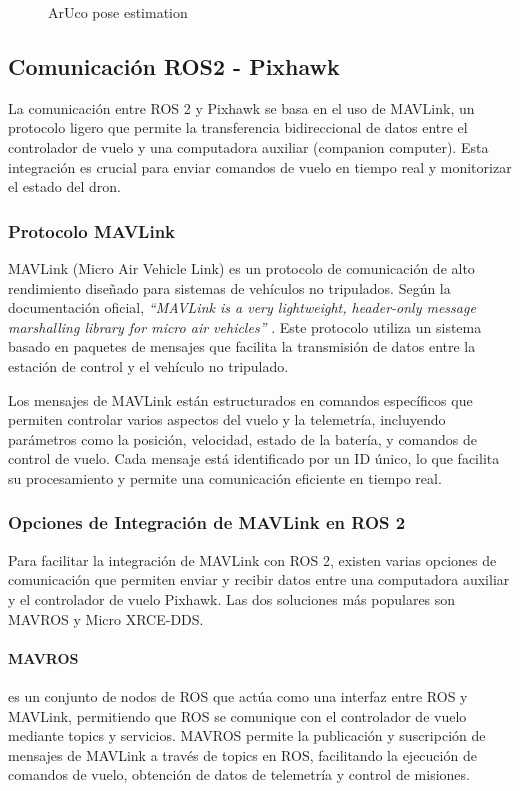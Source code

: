 \begin{figure}[h!]
\begin{minipage}{0.48\textwidth}
                \caption{ArUco pose estimation} 
                \label{fig:aruco_pose_estimation}
            \end{minipage}
    \end{figure}

\subsection{Comunicación ROS2 - Pixhawk}
    La comunicación entre ROS 2 y Pixhawk se basa en el uso de MAVLink, un protocolo ligero que permite la transferencia bidireccional de datos entre el controlador de vuelo y una computadora auxiliar (companion computer). Esta integración es crucial para enviar comandos de vuelo en tiempo real y monitorizar el estado del dron.
    
        \subsubsection{Protocolo MAVLink}
        MAVLink (Micro Air Vehicle Link) es un protocolo de comunicación de alto rendimiento diseñado para sistemas de vehículos no tripulados. Según la documentación oficial, \textit{“MAVLink is a very lightweight, header-only message marshalling library for micro air vehicles”} \cite{mavlink_docs}. Este protocolo utiliza un sistema basado en paquetes de mensajes que facilita la transmisión de datos entre la estación de control y el vehículo no tripulado.
    
        Los mensajes de MAVLink están estructurados en comandos específicos que permiten controlar varios aspectos del vuelo y la telemetría, incluyendo parámetros como la posición, velocidad, estado de la batería, y comandos de control de vuelo. Cada mensaje está identificado por un ID único, lo que facilita su procesamiento y permite una comunicación eficiente en tiempo real.
    
        \subsubsection{Opciones de Integración de MAVLink en ROS 2}
        Para facilitar la integración de MAVLink con ROS 2, existen varias opciones de comunicación que permiten enviar y recibir datos entre una computadora auxiliar y el controlador de vuelo Pixhawk. Las dos soluciones más populares son MAVROS y Micro XRCE-DDS.
    
            \paragraph{MAVROS}
            es un conjunto de nodos de ROS que actúa como una interfaz entre ROS y MAVLink, permitiendo que ROS se comunique con el controlador de vuelo mediante topics y servicios. MAVROS permite la publicación y suscripción de mensajes de MAVLink a través de topics en ROS, facilitando la ejecución de comandos de vuelo, obtención de datos de telemetría y control de misiones.
    
